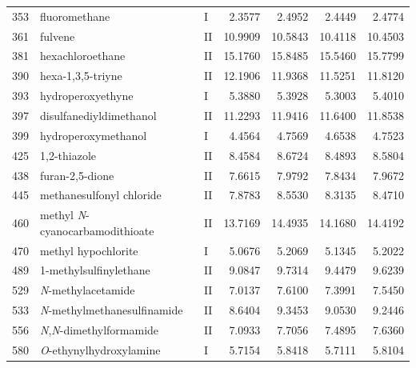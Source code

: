 \begin{longtable}{rlld{2.5}d{2.5}d{2.5}d{2.5}}
    353  & fluoromethane                                          & I  & 2.3577  & 2.4952  & 2.4449  & 2.4774  \\
    361  & fulvene                                                & II & 10.9909 & 10.5843 & 10.4118 & 10.4503 \\
    381  & hexachloroethane                                       & II & 15.1760 & 15.8485 & 15.5460 & 15.7799 \\
    390  & hexa-1,3,5-triyne                                      & II & 12.1906 & 11.9368 & 11.5251 & 11.8120 \\
    393  & hydroperoxyethyne                                      & I  & 5.3880  & 5.3928  & 5.3003  & 5.4010  \\
    397  & disulfanediyldimethanol                                & II & 11.2293 & 11.9416 & 11.6400 & 11.8538 \\
    399  & hydroperoxymethanol                                    & I  & 4.4564  & 4.7569  & 4.6538  & 4.7523  \\
    425  & 1,2-thiazole                                           & II & 8.4584  & 8.6724  & 8.4893  & 8.5804  \\
    438  & furan-2,5-dione                                        & II & 7.6615  & 7.9792  & 7.8434  & 7.9672  \\
    445  & methanesulfonyl chloride                               & II & 7.8783  & 8.5530  & 8.3135  & 8.4710  \\
    460  & methyl \textit{N}-cyanocarbamodithioate                & II & 13.7169 & 14.4935 & 14.1680 & 14.4192 \\
    470  & methyl hypochlorite                                    & I  & 5.0676  & 5.2069  & 5.1345  & 5.2022  \\
    489  & 1-methylsulfinylethane                                 & II & 9.0847  & 9.7314  & 9.4479  & 9.6239  \\
    529  & \textit{N}-methylacetamide                             & II & 7.0137  & 7.6100  & 7.3991  & 7.5450  \\
    533  & \textit{N}-methylmethanesulfinamide                    & II & 8.6404  & 9.3453  & 9.0530  & 9.2446  \\
    556  & \textit{N},\textit{N}-dimethylformamide                & II & 7.0933  & 7.7056  & 7.4895  & 7.6360  \\
    580  & \textit{O}-ethynylhydroxylamine                        & I  & 5.7154  & 5.8418  & 5.7111  & 5.8104  \\

\end{longtable}
